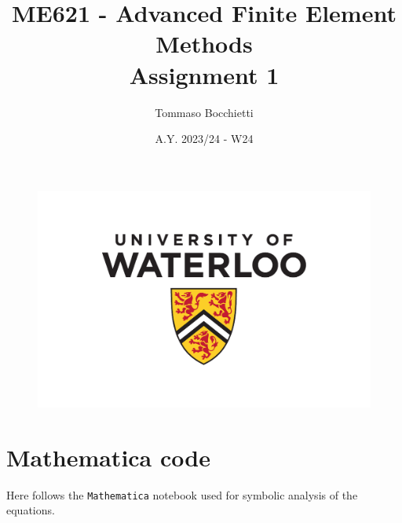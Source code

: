 \documentclass{../../commons/assignment}
\begin{document}
\graphicspath{{./img/}}


\title{ME621 - Advanced Finite Element Methods \\ Assignment 1}
\author{Tommaso Bocchietti}
\date{A.Y. 2023/24 - W24}

\maketitle

\begin{figure}[H]
    \centering
    \includegraphics[width=.9\textwidth]{./pdf/UniversityOfWaterloo_logo_vert_pms}
    \label{fig:University_Of_Waterloo_logo}
\end{figure}

\clearpage
\tableofcontents
\listoffigures
\listoftables
\clearpage







\clearpage


\clearpage
\appendix
\section{Mathematica code}
\label{sec:appendix}

Here follows the \texttt{Mathematica} notebook used for symbolic analysis of the equations.


\end{document}
